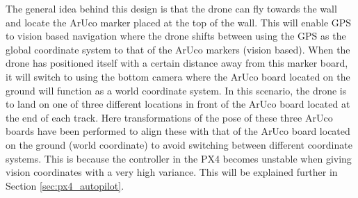 \documentclass[../Head/report.tex]{subfiles}
\begin{document}
The general idea behind this design is that the drone can fly towards the wall and locate the ArUco marker placed at the top of the wall. This will enable GPS to vision based navigation where the drone shifts between using the GPS as the global coordinate system to that of the ArUco markers (vision based). When the drone has positioned itself with a certain distance away from this marker board, it will switch to using the bottom camera where the ArUco board located on the ground will function as a  world coordinate system. In this scenario, the drone is to land on one of three different locations in front of the ArUco board located at the end of each track. Here transformations of the pose of these three ArUco boards have been performed to align these with that of the ArUco board located on the ground (world coordinate) to avoid switching between different coordinate systems. This is because the controller in the PX4 becomes unstable when giving vision coordinates with a very high variance. This will be explained further in Section \ref{sec:px4_autopilot}. 
\end{document}
